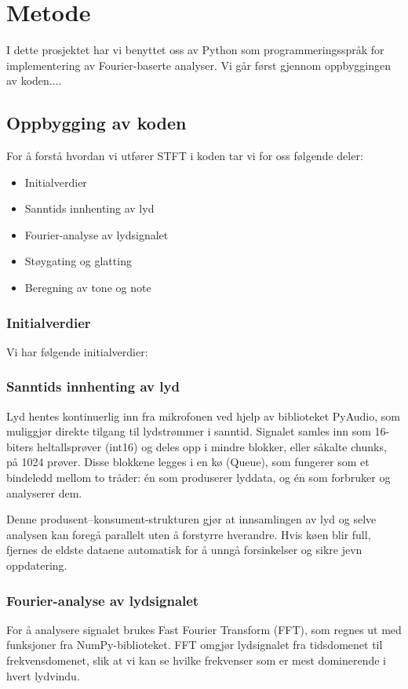 \section{Metode}
I dette prosjektet har vi benyttet oss av Python som programmeringsspråk for implementering av Fourier-baserte analyser. Vi går først gjennom oppbyggingen av koden....

\subsection{Oppbygging av koden}
For å forstå hvordan vi utfører STFT i koden tar vi for oss følgende deler:
\begin{itemize}
    \item Initialverdier
    \item Sanntids innhenting av lyd
    \item Fourier-analyse av lydsignalet
    \item Støygating og glatting
    \item Beregning av tone og note
\end{itemize}

\subsubsection{Initialverdier}
Vi har følgende initialverdier:\subsubsection{Sanntids innhenting av lyd}
Lyd hentes kontinuerlig inn fra mikrofonen ved hjelp av biblioteket PyAudio, som muliggjør direkte tilgang til lydstrømmer i sanntid. Signalet samles inn som 16-biters heltallsprøver (int16) og deles opp i mindre blokker, eller såkalte chunks, på 1024 prøver. Disse blokkene legges i en kø (Queue), som fungerer som et bindeledd mellom to tråder: én som produserer lyddata, og én som forbruker og analyserer dem.

Denne produsent–konsument-strukturen gjør at innsamlingen av lyd og selve analysen kan foregå parallelt uten å forstyrre hverandre. Hvis køen blir full, fjernes de eldste dataene automatisk for å unngå forsinkelser og sikre jevn oppdatering.
\subsubsection{Fourier-analyse av lydsignalet}
For å analysere signalet brukes Fast Fourier Transform (FFT), som regnes ut med funksjoner fra NumPy-biblioteket. FFT omgjør lydsignalet fra tidsdomenet til frekvensdomenet, slik at vi kan se hvilke frekvenser som er mest dominerende i hvert lydvindu.


